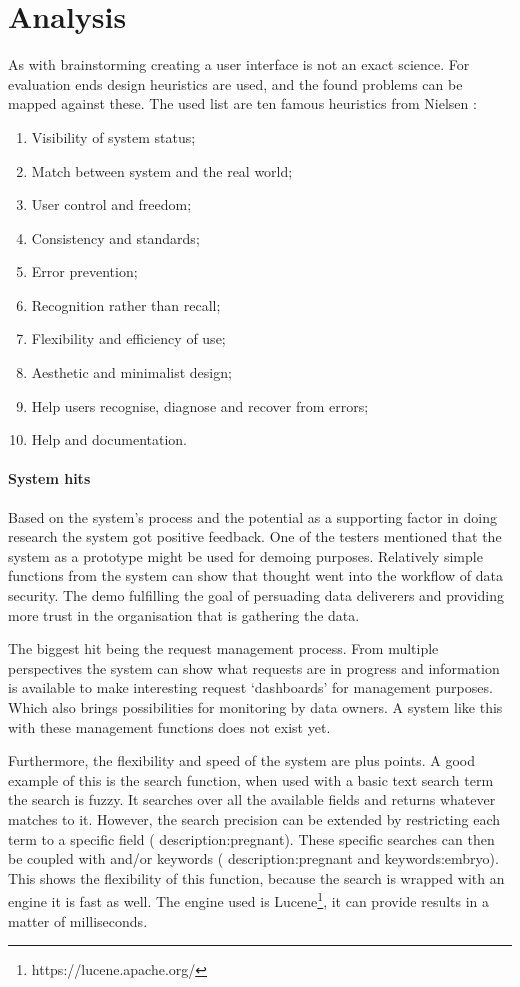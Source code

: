 \section{Analysis}

As with brainstorming creating a user interface is not an exact science.
For evaluation ends design heuristics are used, and the found problems can be mapped against these.
The used list are ten famous heuristics from Nielsen \cite{designHeuristics}:

\begin{enumerate}
	\item Visibility of system status;
	\item Match between system and the real world;
	\item User control and freedom;
	\item Consistency and standards;
	\item Error prevention;
	\item Recognition rather than recall;
	\item Flexibility and efficiency of use;
	\item Aesthetic and minimalist design;
	\item Help users recognise, diagnose and recover from errors;
	\item Help and documentation.
\end{enumerate}

\paragraph{System hits}
Based on the system's process and the potential as a supporting factor in doing research the system got positive feedback.
One of the testers mentioned that the system as a prototype might be used for demoing purposes.
Relatively simple functions from the system can show that thought went into the workflow of data security.
The demo fulfilling the goal of persuading data deliverers and providing more trust in the organisation that is gathering the data.

The biggest hit being the request management process.
From multiple perspectives the system can show what requests are in progress and information is available to make interesting request `dashboards' for management purposes.
Which also brings possibilities for monitoring by data owners.
A system like this with these management functions does not exist yet.

Furthermore, the flexibility and speed of the system are plus points.
A good example of this is the search function, when used with a basic text search term the search is fuzzy.
It searches over all the available fields and returns whatever matches to it.
However, the search precision can be extended by restricting each term to a specific field (\eg{} description:pregnant).
These specific searches can then be coupled with and/or keywords (\eg{} description:pregnant and keywords:embryo).
This shows the flexibility of this function, because the search is wrapped with an engine it is fast as well.
The engine used is Lucene\footnote{https://lucene.apache.org/}, it can provide results in a matter of milliseconds.

